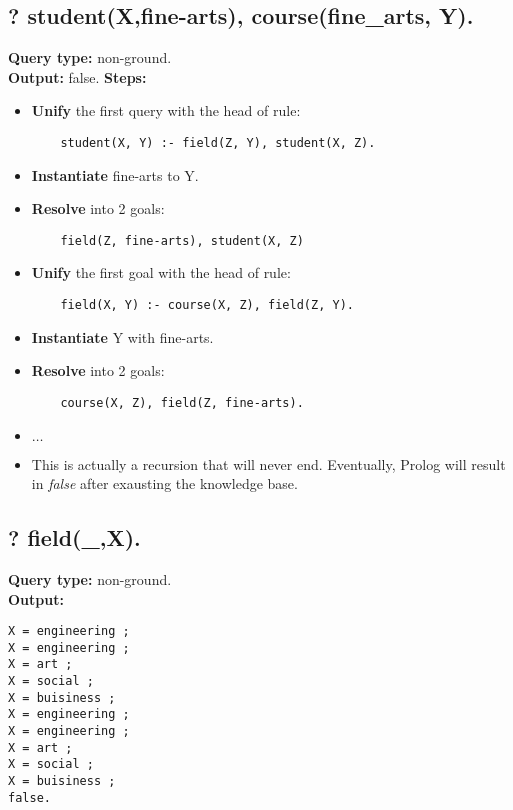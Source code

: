 \subsection{? student(X,fine-arts), course(fine\_arts, Y).}
\textbf{Query type: } non-ground. \\
\textbf{Output:} false.
\textbf{Steps:}
\begin{itemize}
    \item \textbf{Unify} the first query with the head of rule:
    \begin{lstlisting}
    student(X, Y) :- field(Z, Y), student(X, Z).
    \end{lstlisting}
\item \textbf{Instantiate} fine-arts to Y.
\item \textbf{Resolve} into 2 goals:
    \begin{lstlisting}
    field(Z, fine-arts), student(X, Z)
    \end{lstlisting}
\item \textbf{Unify} the first goal with the head of rule:
    \begin{lstlisting}
    field(X, Y) :- course(X, Z), field(Z, Y).
    \end{lstlisting}
\item \textbf{Instantiate} Y with fine-arts.
\item \textbf{Resolve} into 2 goals:
    \begin{lstlisting}
    course(X, Z), field(Z, fine-arts).
    \end{lstlisting}
\item $\ldots$
\item This is actually a recursion that will never end. Eventually, Prolog will result in \textit{false} after exausting the knowledge base.
\end{itemize}

\subsection{? field(\_,X).}
\textbf{Query type: } non-ground. \\
\textbf{Output:} 
\begin{lstlisting}
X = engineering ;
X = engineering ;
X = art ;
X = social ;
X = buisiness ;
X = engineering ;
X = engineering ;
X = art ;
X = social ;
X = buisiness ;
false.
\end{lstlisting}

